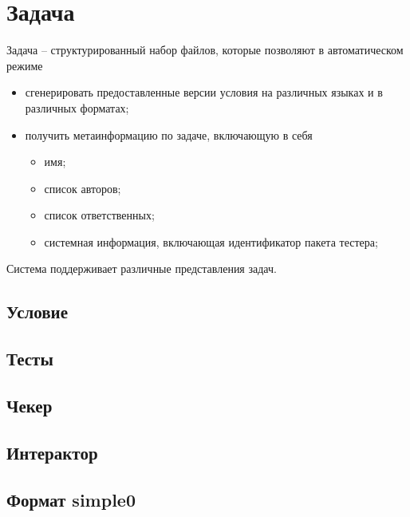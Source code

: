 \section{Задача}
\label{bacsproblem}
Задача -- структурированный набор файлов,
которые позволяют в автоматическом режиме
\begin{itemize}
    \item сгенерировать предоставленные версии условия
        на различных языках и в различных форматах;
    \item получить метаинформацию по задаче, включающую в себя
        \begin{itemize}
            \item имя;
            \item список авторов;
            \item список ответственных;
            \item системная информация, включающая идентификатор пакета тестера;
        \end{itemize}
\end{itemize}

Система поддерживает различные представления задач.

\subsection{Условие}

\subsection{Тесты}

\subsection{Чекер}

\subsection{Интерактор}

\subsection{Формат simple0}

